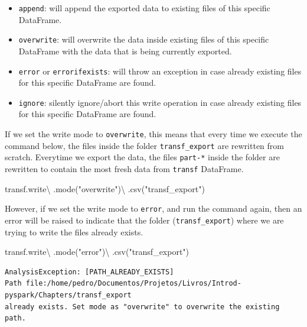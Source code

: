 \documentclass[
  11pt,
  letterpaper,
  DIV=11,
  numbers=noendperiod]{scrreprt}
\newenvironment{Shaded}{\begin{snugshade}}{\end{snugshade}}
\newcommand{\NormalTok}[1]{\textcolor[rgb]{0.00,0.23,0.31}{#1}}
\newcommand{\OperatorTok}[1]{\textcolor[rgb]{0.37,0.37,0.37}{#1}}
\newcommand{\StringTok}[1]{\textcolor[rgb]{0.13,0.47,0.30}{#1}}
\providecommand{\tightlist}{%
  \setlength{\itemsep}{0pt}\setlength{\parskip}{0pt}}\usepackage{longtable,booktabs,array}
\begin{document}
\begin{itemize}
\tightlist
\item
  \texttt{append}: will append the exported data to existing files of
  this specific DataFrame.
\item
  \texttt{overwrite}: will overwrite the data inside existing files of
  this specific DataFrame with the data that is being currently
  exported.
\item
  \texttt{error} or \texttt{errorifexists}: will throw an exception in
  case already existing files for this specific DataFrame are found.
\item
  \texttt{ignore}: silently ignore/abort this write operation in case
  already existing files for this specific DataFrame are found.
\end{itemize}

If we set the write mode to \texttt{overwrite}, this means that every
time we execute the command below, the files inside the folder
\texttt{transf\_export} are rewritten from scratch. Everytime we export
the data, the files \texttt{part-*} inside the folder are rewritten to
contain the most fresh data from \texttt{transf} DataFrame.

\begin{Shaded}
\begin{Highlighting}[]
\NormalTok{transf.write}\OperatorTok{\textbackslash{}}
\NormalTok{    .mode(}\StringTok{"overwrite"}\NormalTok{)}\OperatorTok{\textbackslash{}}
\NormalTok{    .csv(}\StringTok{"transf\_export"}\NormalTok{)}
\end{Highlighting}
\end{Shaded}

However, if we set the write mode to \texttt{error}, and run the command
again, then an error will be raised to indicate that the folder
(\texttt{transf\_export}) where we are trying to write the files already
exists.

\begin{Shaded}
\begin{Highlighting}[]
\NormalTok{transf.write}\OperatorTok{\textbackslash{}}
\NormalTok{    .mode(}\StringTok{"error"}\NormalTok{)}\OperatorTok{\textbackslash{}}
\NormalTok{    .csv(}\StringTok{"transf\_export"}\NormalTok{)}
\end{Highlighting}
\end{Shaded}

\begin{verbatim}
AnalysisException: [PATH_ALREADY_EXISTS]
Path file:/home/pedro/Documentos/Projetos/Livros/Introd-pyspark/Chapters/transf_export
already exists. Set mode as "overwrite" to overwrite the existing path.
\end{verbatim}
\end{document}
